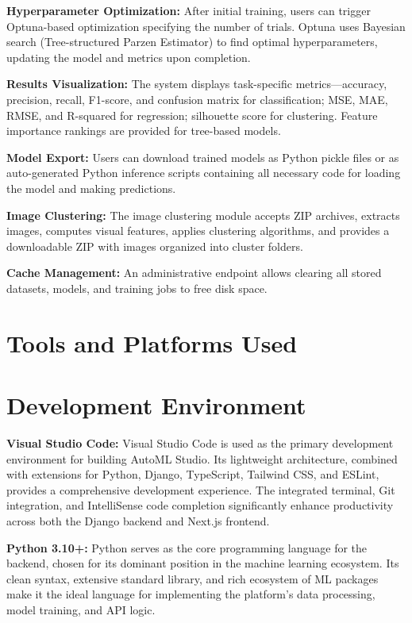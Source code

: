 \documentclass[12pt,a4paper]{report}
\begin{document}
\textbf{Hyperparameter Optimization:} After initial training, users can trigger Optuna-based optimization specifying the number of trials. Optuna uses Bayesian search (Tree-structured Parzen Estimator) to find optimal hyperparameters, updating the model and metrics upon completion.

\textbf{Results Visualization:} The system displays task-specific metrics—accuracy, precision, recall, F1-score, and confusion matrix for classification; MSE, MAE, RMSE, and R-squared for regression; silhouette score for clustering. Feature importance rankings are provided for tree-based models.

\textbf{Model Export:} Users can download trained models as Python pickle files or as auto-generated Python inference scripts containing all necessary code for loading the model and making predictions.

\textbf{Image Clustering:} The image clustering module accepts ZIP archives, extracts images, computes visual features, applies clustering algorithms, and provides a downloadable ZIP with images organized into cluster folders.

\textbf{Cache Management:} An administrative endpoint allows clearing all stored datasets, models, and training jobs to free disk space.

\newpage
\section{Tools and Platforms Used}

\section{Development Environment}

\textbf{Visual Studio Code:}
Visual Studio Code is used as the primary development environment for building AutoML Studio. Its lightweight architecture, combined with extensions for Python, Django, TypeScript, Tailwind CSS, and ESLint, provides a comprehensive development experience. The integrated terminal, Git integration, and IntelliSense code completion significantly enhance productivity across both the Django backend and Next.js frontend.

\vspace{0.4cm}

\textbf{Python 3.10+:}
Python serves as the core programming language for the backend, chosen for its dominant position in the machine learning ecosystem. Its clean syntax, extensive standard library, and rich ecosystem of ML packages make it the ideal language for implementing the platform's data processing, model training, and API logic.
\end{document}
